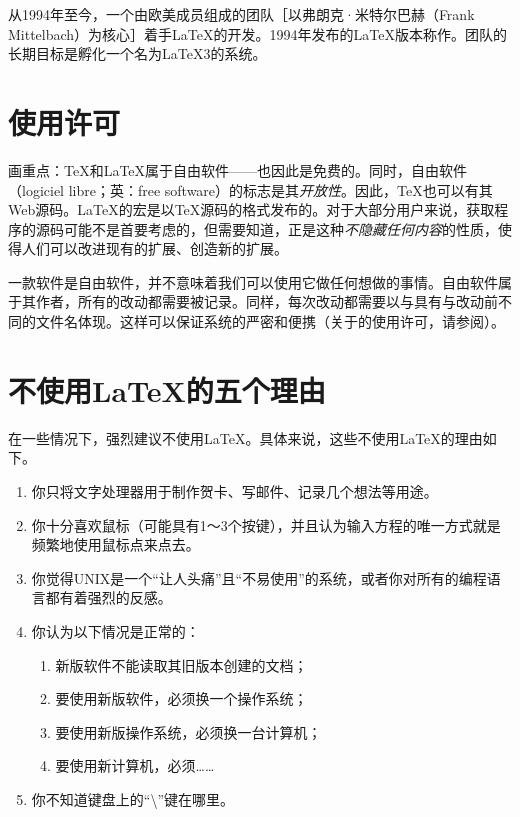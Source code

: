 从1994年至今，一个由欧美成员组成的团队［以弗朗克·米特尔巴赫（Frank Mittelbach）为核心］着手\LaTeX 的开发。1994年发布的\LaTeX 版本称作\LaTeXe。团队的长期目标是孵化一个名为\LaTeX 3的系统。

\section*{使用许可}

画重点：\TeX 和\LaTeX 属于自由软件——也因此是免费的。同时，自由软件（logiciel libre；英：free software）的标志是其\textit{开放性}。因此，\TeX 也可以有其Web源码。\LaTeX 的宏是以\TeX 源码的格式发布的。对于大部分用户来说，获取程序的源码可能不是首要考虑的，但需要知道，正是这种\textit{不隐藏任何内容}的性质，使得人们可以改进现有的扩展、创造新的扩展。

一款软件是自由软件，并不意味着我们可以使用它做任何想做的事情。自由软件属于其作者，所有的改动都需要被记录。同样，每次改动都需要以与具有与改动前不同的文件名体现。这样可以保证系统的严密和便携（关于\LaTeXe 的使用许可，请参阅）。

\section*{不使用\LaTeX 的五个理由}

在一些情况下，强烈建议不使用\LaTeX 。具体来说，这些不使用\LaTeX 的理由如下。

\begin{enumerate}
    \item 你只将文字处理器用于制作贺卡、写邮件、记录几个想法等用途。
    \item 你十分喜欢鼠标（可能具有1～3个按键），并且认为输入方程的唯一方式就是频繁地使用鼠标点来点去。
    \item 你觉得UNIX是一个“让人头痛”且“不易使用”的系统，或者你对所有的编程语言都有着强烈的反感。
    \item 你认为以下情况是正常的：
        \begin{enumerate}
            \item 新版软件不能读取其旧版本创建的文档；
            \item 要使用新版软件，必须换一个操作系统；
            \item 要使用新版操作系统，必须换一台计算机；
            \item 要使用新计算机，必须……
        \end{enumerate}
    \item 你不知道键盘上的“\backslash”键在哪里。
\end{enumerate}

